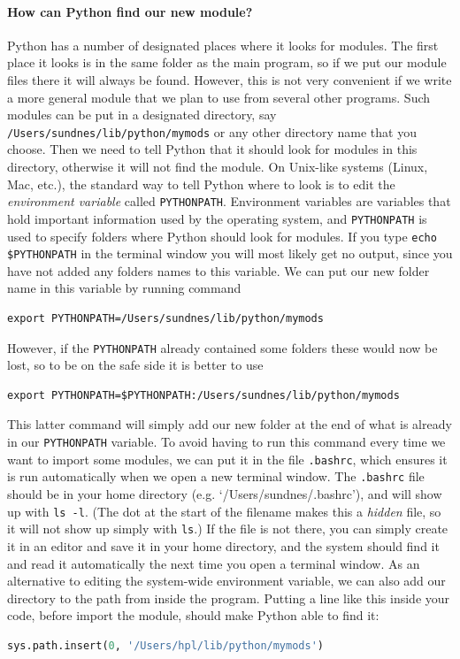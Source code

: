 \documentclass[graybox,envcountchap,sectrefs,final]{svmonodo}
\begin{document}
\paragraph{How can Python find our new module?}
Python has a number of designated places where it looks for modules. The first place it looks is in the same folder as
the main program, so if we put our module files there it will always be found. However, this is not
very convenient if we write a more general module that we plan to use from several other programs. Such modules
can be put in a designated directory, say \texttt{/Users/sundnes/lib/python/mymods} or any other directory name that
you choose. Then we need to tell Python that it should look for modules in this directory, otherwise it will not find
the module. On Unix-like systems (Linux, Mac, etc.), the standard way to tell Python where to look is to
edit the \emph{environment variable} called \texttt{PYTHONPATH}. Environment variables are variables that
hold important information used by the operating system, and \texttt{PYTHONPATH} is used to specify folders
where Python should look for modules. If you type \Verb!echo $PYTHONPATH! in the terminal window you will most likely
get no output, since you have not added any folders names to this variable. We can put our new folder name in this
variable by running
command
\begin{Verbatim}[frame=lines,label=\fbox{{\tiny Terminal}},framesep=2.5mm,framerule=0.7pt]
export PYTHONPATH=/Users/sundnes/lib/python/mymods
\end{Verbatim}
However, if the \texttt{PYTHONPATH} already contained some folders these would now be lost, so to be on the
safe side it is better to use
\begin{Verbatim}[frame=lines,label=\fbox{{\tiny Terminal}},framesep=2.5mm,framerule=0.7pt]
export PYTHONPATH=$PYTHONPATH:/Users/sundnes/lib/python/mymods
\end{Verbatim}
This latter command will simply add our new folder at the end of what is already in our \texttt{PYTHONPATH} variable.
To avoid having to run this command every time we want to import some modules, we can put it in the file \texttt{.bashrc},
which ensures it is run automatically when we open a new terminal window. The \texttt{.bashrc} file should be in
your home directory (e.g. `/Users/sundnes/.bashrc'), and will show up with \texttt{ls -l}. (The dot at the start of the
filename makes this a \emph{hidden} file, so it will not show up simply with \texttt{ls}.) If the file is not there, you can simply
create it in an editor and save it in your home directory, and the system should find it and read it automatically
the next time you open a terminal window. As an alternative to editing the system-wide environment variable,
we can also add our directory to the path from inside the
program. Putting a line like this inside your code, before import the module, should make Python able to find it:
\begin{lstlisting}[language=Python,style=blue1]
sys.path.insert(0, '/Users/hpl/lib/python/mymods')
\end{lstlisting}
\end{document}
